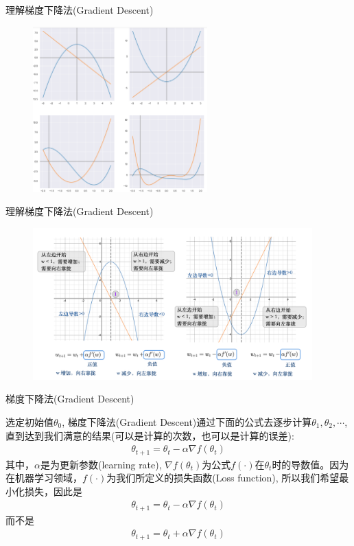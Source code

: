 \documentclass[handout]{ctexbeamer}
\begin{document}
\begin{frame}{理解梯度下降法(Gradient Descent)}
\begin{figure}[H]
	\centering
	\includegraphics[width=0.6\textwidth]{fig/C2preGd2}
\end{figure}	
\end{frame}


\begin{frame}{理解梯度下降法(Gradient Descent)}
\begin{figure}[H]
	\centering
	\includegraphics[width=0.96\textwidth]{fig/C2C2GradientDes}
\end{figure}	
\end{frame}

\begin{frame}{梯度下降法(Gradient Descent)}
\begin{definition}
	选定初始值$\theta_0$, 梯度下降法(Gradient Descent)通过下面的公式去逐步计算$\theta_1, \theta_2, \cdots$,直到达到我们满意的结果(可以是计算的次数，也可以是计算的误差):
	\begin{align*}
		\theta_{t+1} = \theta_t - \alpha \nabla f(\theta_t)
	\end{align*}
	其中，$\alpha$是为更新参数(learning rate), $\nabla f(\theta_t)$为公式$f(\cdot)$在$\theta_t$时的导数值。因为在机器学习领域，$f(\cdot)$为我们所定义的损失函数(Loss function), 所以我们希望最小化损失，因此是
	\begin{align*}
		\theta_{t+1} = \theta_t - \alpha \nabla f(\theta_t)
	\end{align*}
	而不是
	\begin{align*}
		\theta_{t+1} = \theta_t + \alpha \nabla f(\theta_t)
	\end{align*}
\end{definition}
\end{frame}
\end{document}
